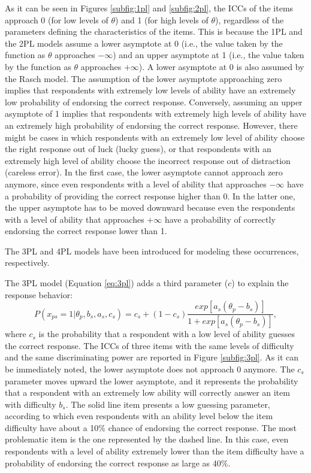\documentclass[12pt]{book}
\begin{document}
As it can be seen in Figures \ref{subfig:1pl} and \ref{subfig:2pl}, the ICCs of the items approach 0 (for low levels of $\theta$) and 1 (for high levels of $\theta$), regardless of the parameters defining the characteristics of the items. This is because the 1PL and the 2PL models assume a lower asymptote at 0 (i.e., the value taken by the function as $\theta$ approaches $- \infty$) and an upper asymptote at 1 (i.e., the value taken by the function as $\theta$ approaches $+ \infty$). A lower asymptote at 0 is also assumed by the Rasch model.
The assumption of the lower asymptote approaching zero implies that respondents with extremely low levels of ability have an extremely low probability of endorsing the correct response. 
Conversely, assuming an upper asymptote of 1 implies that respondents with extremely high levels of ability have an extremely high probability of endorsing the correct response. 
However, there might be cases in which respondents with an extremely low level of ability choose the right response  out of luck (lucky guess), or that respondents with an extremely high level of ability choose the incorrect response  out of distraction (careless error). 
In the first case, the lower asymptote cannot approach zero anymore, since even respondents with a level of ability that approaches $- \infty$ have a probability of providing the correct response higher than 0. 
In the latter one, the upper asymptote has to be moved downward because even the respondents with a level of ability that approaches $+ \infty$ have a probability of correctly endorsing the correct response lower than 1. 

The 3PL and 4PL models have been introduced for modeling these occurrences, respectively.

The 3PL model (Equation \ref{eq:3pl}) \cite{lord}  adds a third parameter ($c$) to explain the response behavior: 
\begin{equation}\label{eq:3pl}
	P(x_{ps} = 1 | \theta_p, b_s, a_s, c_s) = c_s + (1-c_s)\frac{exp[a_s(\theta_p - b_s)]}{1 + exp[a_s(\theta_p - b_s)]},
\end{equation}
where $c_s$ is the probability that a respondent with a low level of ability guesses the correct response. 
The ICCs of three items with the same levels of difficulty and the same discriminating power are reported in Figure \ref{subfig:3pl}. As it can be immediately noted, the lower asymptote does not approach 0 anymore.
	The $c_s$ parameter moves upward the lower asymptote, and it represents the probability that a respondent with an extremely low ability will correctly answer an item with difficulty $b_s$.
The solid line item presents a low guessing parameter, according to which even respondents with an ability level below the item difficulty have about a 10\% chance of endorsing the correct response. 
	The most problematic item is the one represented by the dashed line. In this case, even respondents with a level of ability extremely lower than the item difficulty have a probability of endorsing the correct response as large as 40\%.
\end{document}
